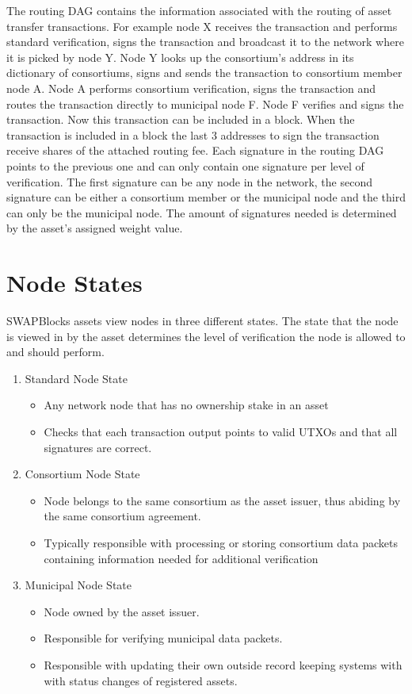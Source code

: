 \documentclass[12pt]{article}
\begin{document}
The routing DAG contains the information associated with the routing of asset 
transfer transactions.  For example node X receives the transaction and performs standard 
verification, signs the transaction and broadcast it to the network where it is picked
by node Y. Node Y looks up the consortium's address in its dictionary of 
consortiums, signs and sends the transaction to consortium member node A. Node A performs 
consortium verification, signs the transaction and routes the transaction directly to 
municipal node F.  Node F verifies and signs the transaction. 
Now this transaction can be included in a block.  When the 
transaction is included in a block the last 3 addresses to sign the transaction 
receive shares of the attached routing fee.  Each signature in the routing DAG points 
to the previous one and can only contain one signature per level of verification.  
The first signature can be any node in the network, 
the second signature can be either a consortium member or the municipal node 
and the third can only be the municipal node.  The amount of signatures needed 
is determined by the asset's assigned weight value. 




\section{Node States}

SWAPBlocks assets view nodes in three different states. The state that the node is viewed in 
by the asset determines the level of verification the node is allowed to and should
perform.


\begin{enumerate}
	\item Standard Node State
		\begin{itemize}
			\item{Any network node that has no ownership stake in an asset}
			\item{Checks that each transaction output points to valid UTXOs
				and that all signatures are correct.}
		\end{itemize}
	\item Consortium Node State
		\begin{itemize}
			\item{Node belongs to the same consortium as the asset issuer,
				thus abiding by the same consortium agreement.}
			\item{Typically responsible with processing  or storing
				consortium data packets containing information 
				needed for additional verification}
		\end{itemize}
	\item Municipal Node State
		\begin{itemize}
			\item{Node owned by the asset issuer.}
			\item{Responsible for verifying municipal data packets.}
			\item{Responsible with updating their own outside record keeping systems with
				with status changes of registered assets.}	
		\end{itemize}
\end{enumerate}
\end{document}
